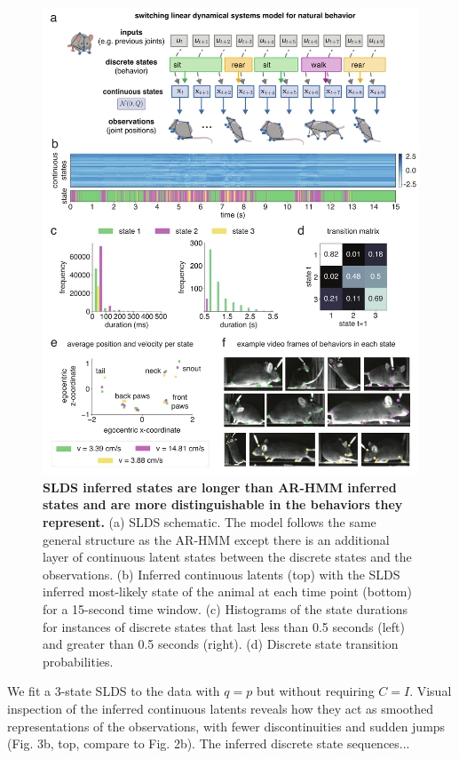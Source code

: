 \begin{figure}[t!]
  \begin{center}
    \includegraphics[width=0.90\linewidth]{ch3-slds/slds-figures/Fig3.pdf}
    \caption[SLDS inferred states are longer than AR-HMM inferred states and are more distinguishable in the behaviors they represent]{\textbf{SLDS inferred states are longer than AR-HMM inferred states and are more distinguishable in the behaviors they represent.} (a) SLDS schematic. The model follows the same general structure as the AR-HMM except there is an additional layer of continuous latent states between the discrete states and the observations. (b) Inferred continuous latents (top) with the SLDS inferred most-likely state of the animal at each time point (bottom) for a 15-second time window. (c) Histograms of the state durations for instances of discrete states that last less than 0.5 seconds (left) and greater than 0.5 seconds (right). (d) Discrete state transition probabilities. }
    \label{fig:slds:3}
  \end{center}
  \vspace{-0.5cm}
\end{figure}
\begin{figure}[t!]
\end{figure}

We fit a 3-state SLDS to the data with $q=p$ but without requiring $C=I$. Visual inspection of the inferred continuous latents reveals how they act as smoothed representations of the observations, with fewer discontinuities and sudden jumps (Fig. 3b, top, compare to Fig. 2b). The inferred discrete state sequences... 
